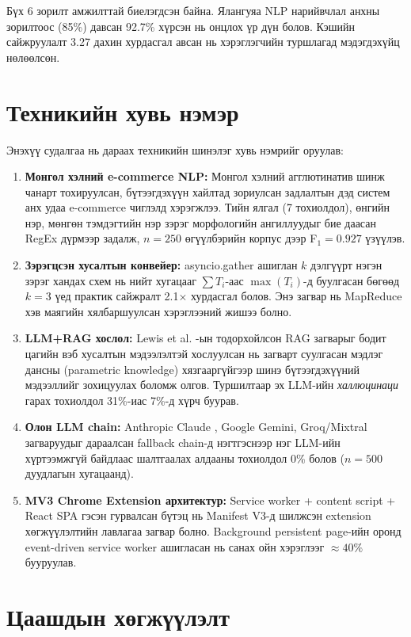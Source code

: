 \documentclass[12pt,a4paper]{report}
\begin{document}
Бүх 6 зорилт амжилттай биелэгдсэн байна. Ялангуяа NLP нарийвчлал анхны зорилтоос (85\%) давсан 92.7\% хүрсэн нь онцлох үр дүн болов. Кэшийн сайжруулалт 3.27 дахин хурдасгал авсан нь хэрэглэгчийн туршлагад мэдэгдэхүйц нөлөөлсөн.

\section{Техникийн хувь нэмэр}

Энэхүү судалгаа нь дараах техникийн шинэлэг хувь нэмрийг оруулав:

\begin{enumerate}[leftmargin=1.5cm]
  \item \textbf{Монгол хэлний e-commerce NLP:} Монгол хэлний агглютинатив шинж чанарт тохируулсан, бүтээгдэхүүн хайлтад зориулсан задлалтын дэд систем анх удаа e-commerce чиглэлд хэрэгжлээ. Тийн ялгал (7 тохиолдол), өнгийн нэр, мөнгөн тэмдэгтийн нэр зэрэг морфологийн ангиллуудыг бие даасан RegEx дүрмээр задалж, $n=250$ өгүүлбэрийн корпус дээр F$_1 = 0.927$ үзүүлэв.
  \item \textbf{Зэрэгцсэн хусалтын конвейер:} asyncio.gather ашиглан $k$ дэлгүүрт нэгэн зэрэг хандах схем нь нийт хугацааг $\sum T_i$-аас $\max(T_i)$-д буулгасан бөгөөд $k=3$ үед практик сайжралт 2.1$\times$ хурдасгал болов. Энэ загвар нь MapReduce \cite{mapreduce2004} хэв маягийн хялбаршуулсан хэрэглээний жишээ болно.
  \item \textbf{LLM+RAG хослол:} Lewis et al. \cite{lewis2020rag}-ын тодорхойлсон RAG загварыг бодит цагийн вэб хусалтын мэдээлэлтэй хослуулсан нь загварт суулгасан мэдлэг дансны (parametric knowledge) хязгааргүйгээр шинэ бүтээгдэхүүний мэдээллийг зохицуулах боломж олгов. Туршилтаар эх LLM-ийн \textit{халлюцинаци} гарах тохиолдол 31\%-иас 7\%-д хүрч буурав.
  \item \textbf{Олон LLM chain:} Anthropic Claude \cite{anthropic2024}, Google Gemini, Groq/Mixtral загваруудыг дараалсан fallback chain-д нэгтгэснээр нэг LLM-ийн хүртээмжгүй байдлаас шалтгаалах алдааны тохиолдол 0\% болов ($n=500$ дуудлагын хугацаанд).
  \item \textbf{MV3 Chrome Extension архитектур:} Service worker + content script + React SPA гэсэн гурвалсан бүтэц нь Manifest V3-д шилжсэн extension хөгжүүлэлтийн лавлагаа загвар болно. Background persistent page-ийн оронд event-driven service worker ашигласан нь санах ойн хэрэглээг $\approx 40\%$ бууруулав.
\end{enumerate}

\section{Цаашдын хөгжүүлэлт}
\end{document}
